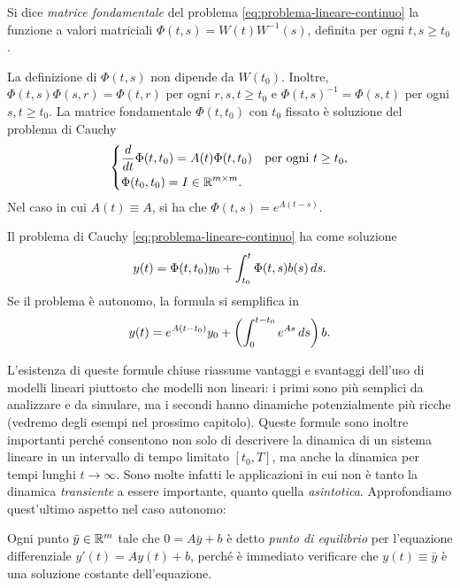 \begin{defi}
Si dice \emph{matrice fondamentale} del problema \eqref{eq:problema-lineare-continuo}
la funzione a valori matriciali $\Phi(t,s) = W(t)W^{-1}(s)$,
definita per ogni $t,s \geq t_0$.
\end{defi}

\begin{teor}
La definizione di $\Phi(t,s)$ non dipende da $W(t_0)$.
Inoltre, $\Phi(t,s) \Phi(s,r) = \Phi(t,r)$ per ogni $r,s,t \geq t_0$
e $\Phi(t,s)^{-1} = \Phi(s,t)$ per ogni $s,t \geq t_0$.
La matrice fondamentale $\Phi(t,t_0)$ con $t_0$ fissato è soluzione
del problema di Cauchy
\[
\left\{
\begin{aligned}
& \frac{d}{dt} \Phi(t,t_0) = A(t) \Phi(t,t_0) \quad \text{per ogni $t \geq t_0$}, \\
& \Phi(t_0,t_0) = I \in \mathbb{R}^{m \times m}.
\end{aligned}
\right.
\]
Nel caso in cui $A(t) \equiv A$, si ha che $\Phi(t,s) = e^{A(t-s)}$.
\end{teor}

\begin{teor}
Il problema di Cauchy \eqref{eq:problema-lineare-continuo} ha come soluzione
\begin{equation}  \label{eq:soluzione-problema-lineare-continuo}
y(t) = \Phi(t,t_0) y_0 + \int_{t_0}^t \Phi(t,s) b(s) \, ds.
\end{equation}
Se il problema è autonomo, la formula si semplifica in
\begin{equation} \label{eq:soluzione-problema-lineare-autonomo-continuo}
y(t) = e^{A(t-t_0)} y_0 + \left( \int_0^{t-t_0} e^{As} \, ds \right) b.
\end{equation}
\end{teor}

L'esistenza di queste formule chiuse riassume vantaggi e svantaggi
dell'uso di modelli lineari piuttosto che modelli non lineari:
i primi sono più semplici da analizzare e da simulare, ma i secondi
hanno dinamiche potenzialmente più ricche (vedremo degli esempi
nel prossimo capitolo). Queste formule sono inoltre importanti
perché consentono non solo di descrivere la dinamica di un sistema
lineare in un intervallo di tempo limitato $[t_0,T]$, ma anche la
dinamica per tempi lunghi $t \to \infty$. Sono molte infatti le applicazioni
in cui non è tanto la dinamica \emph{transiente} a essere importante,
quanto quella \emph{asintotica}. Approfondiamo quest'ultimo aspetto
nel caso autonomo:

\begin{defi}
Ogni punto $\bar{y} \in \mathbb{R}^m$ tale che $0 = A\bar{y} + b$ è detto
\emph{punto di equilibrio} per l'equazione differenziale
$y'(t) = A y(t) + b$, perché è immediato verificare che $y(t) \equiv \bar{y}$
è una soluzione costante dell'equazione.
\end{defi}

